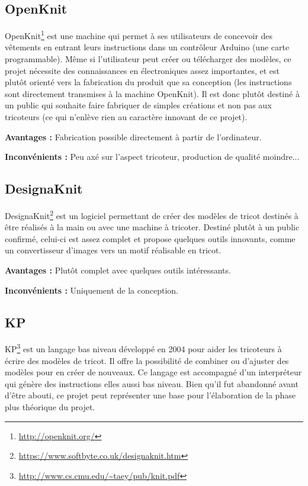 \documentclass{article}
\begin{document}
\subsection{OpenKnit}

OpenKnit\footnote{\url{http://openknit.org/}} est une machine qui permet à ses utilisateurs de concevoir des vêtements en entrant leurs
instructions dans un contrôleur Arduino (une carte programmable). Même si l'utilisateur peut créer ou télécharger des modèles, ce projet
nécessite des connaissances en électroniques assez importantes, et est plutôt orienté vers la fabrication du produit que sa conception
(les instructions sont directement transmises à la machine OpenKnit). Il est donc plutôt destiné à un public qui souhaite faire fabriquer
de simples créations et non pas aux tricoteurs (ce qui n'enlève rien au caractère innovant de ce projet).

\textbf{Avantages : } Fabrication possible directement à partir de l'ordinateur.

\textbf{Inconvénients : } Peu axé sur l'aspect tricoteur, production de qualité moindre...

\subsection{DesignaKnit}

DesignaKnit\footnote{\url{https://www.softbyte.co.uk/designaknit.htm}} est un logiciel permettant de créer des modèles de tricot destinés
à être réalisés à la main ou avec une machine à tricoter. Destiné plutôt à un public confirmé, celui-ci est assez complet et propose
quelques outils innovants, comme un convertisseur d'images vers un motif réalisable en tricot.

\textbf{Avantages : } Plutôt complet avec quelques outils intéressants.

\textbf{Inconvénients : } Uniquement de la conception.

\subsection{KP}

KP\footnote{\url{http://www.cs.cmu.edu/~taey/pub/knit.pdf}} est un langage bas niveau développé en 2004 pour aider les tricoteurs à écrire
des modèles de tricot. Il offre la possibilité de combiner ou d'ajuster des modèles pour en créer de nouveaux. Ce langage est accompagné
d'un interpréteur qui génère des instructions elles aussi bas niveau. Bien qu'il fut abandonné avant d'être abouti, ce projet peut
représenter une base pour l'élaboration de la phase plus théorique du projet.
\end{document}
